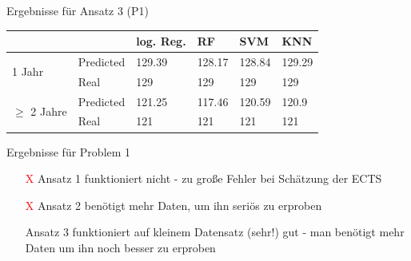 \documentclass[17pt, fleqn]{beamer}
\begin{document}
\begin{frame}{Ergebnisse für Ansatz 3 (P1)}
    \pause
    \scriptsize{
    \begin{table}[ht]
        \begin{tabular}{ p{1.5cm} p{1.5cm} p{1cm} p{1cm} p{1cm} p{1cm} }
                         &                  & log. Reg.                                  & RF                                         & SVM                                        & KNN                                        \\
          \hline
          \multirow{2}{3em}{1 Jahr}
                         & Predicted        & 129.39                                     & 128.17                                     & 128.84                                     & 129.29                                     \\
                         & Real             & 129                                        & 129                                        & 129                                        & 129                                        \\
      
          \multirow{2}{2.5cm}{$\geq$ 2 Jahre}
                         & Predicted        & 121.25                                     & 117.46                                     & 120.59                                     & 120.9                                      \\
                         & Real             & 121                                        & 121                                        & 121                                        & 121                                        \\
          \hline

        \end{tabular}
      \end{table}
    }
\end{frame}

\begin{frame}{Ergebnisse für Problem 1}
    \pause
    \small{
    \begin{itemize}
        \item[\textcolor{red}{X}] Ansatz 1 funktioniert nicht - zu große Fehler bei Schätzung der ECTS \pause
        \item[\textcolor{red}{X}] Ansatz 2 benötigt mehr Daten, um ihn seriös zu erproben \pause
        \item[\textcolor{green}{\checkmark}] Ansatz 3 funktioniert auf kleinem Datensatz (sehr!) gut - man benötigt mehr Daten um ihn noch besser zu erproben
    \end{itemize}
    }
    
\end{frame}
\end{document}
